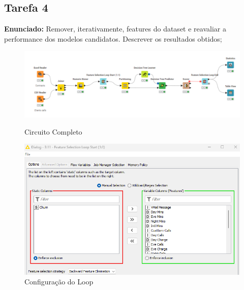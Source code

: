 \documentclass[a4paper, 12pt]{article}
\begin{document}
\newpage

\subsection{Tarefa 4}
\textbf{Enunciado:} Remover, iterativamente, features do dataset e reavaliar a performance dos modelos candidatos. Descrever os resultados obtidos;

\begin{figure}[htp]
    
     \centering
     \includegraphics[scale=0.7]{T4/Circuito.png}
     \caption{Circuito Completo}
     \vspace{0.5cm}
     \centering
     \includegraphics[scale=0.7]{T4/config_loop.png}
     \caption{Configuração do Loop}
\end{figure} 
\end{document}
